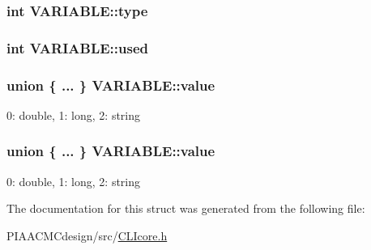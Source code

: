 \hypertarget{structVARIABLE_a84814331e54156c3ac9fbe6d2b851daf}{
\subsubsection[{type}]{\setlength{\rightskip}{0pt plus 5cm}int V\+A\+R\+I\+A\+B\+L\+E\+::type}}\label{structVARIABLE_a84814331e54156c3ac9fbe6d2b851daf}
\hypertarget{structVARIABLE_a33fcb1d4034cdf238453dc4ac3f17290}{
\subsubsection[{used}]{\setlength{\rightskip}{0pt plus 5cm}int V\+A\+R\+I\+A\+B\+L\+E\+::used}}\label{structVARIABLE_a33fcb1d4034cdf238453dc4ac3f17290}
\hypertarget{structVARIABLE_a5928e86d82f206db6dcef64844e7756a}{
\subsubsection[{value}]{\setlength{\rightskip}{0pt plus 5cm}union \{ ... \}   V\+A\+R\+I\+A\+B\+L\+E\+::value}}\label{structVARIABLE_a5928e86d82f206db6dcef64844e7756a}
0\+: double, 1\+: long, 2\+: string \hypertarget{structVARIABLE_ac78c074d5d0c437357a205d97ee58c70}{
\subsubsection[{value}]{\setlength{\rightskip}{0pt plus 5cm}union \{ ... \}   V\+A\+R\+I\+A\+B\+L\+E\+::value}}\label{structVARIABLE_ac78c074d5d0c437357a205d97ee58c70}
0\+: double, 1\+: long, 2\+: string 

The documentation for this struct was generated from the following file\+:\begin{DoxyCompactItemize}
\item 
P\+I\+A\+A\+C\+M\+Cdesign/src/\hyperlink{PIAACMCdesign_2src_2CLIcore_8h}{C\+L\+Icore.\+h}\end{DoxyCompactItemize}
